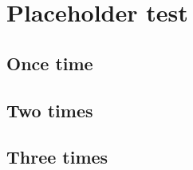 

\section{Placeholder test}

\subsection{Once time}

\lipsum

\subsection{Two times}

\lipsum

\subsection{Three times}

\lipsum

